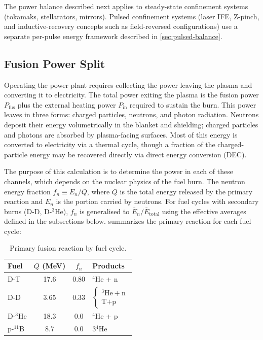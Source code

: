 \documentclass{article}
\begin{document}
The power balance described next applies to steady-state confinement
systems (tokamaks, stellarators, mirrors). Pulsed confinement
systems (laser IFE, Z-pinch, and inductive-recovery concepts such as
field-reversed configurations) use a separate per-pulse energy
framework described in \cref{sec:pulsed-balance}.

\subsection{Fusion Power Split}

Operating the power plant requires collecting the power leaving the
plasma and converting it to electricity. The total power exiting the
plasma is the fusion power $P_{\text{fus}}$ plus the external heating
power $P_{\text{in}}$ required to sustain the burn. This power leaves
in three forms: charged particles, neutrons, and photon
radiation. Neutrons deposit their energy volumetrically in the blanket
and shielding; charged particles and photons are absorbed by
plasma-facing surfaces. Most of this energy is converted to electricity
via a thermal cycle, though a fraction of the charged-particle energy
may be recovered directly via direct energy conversion (DEC).

The purpose of this calculation is to determine the power in each of
these channels, which depends on the nuclear physics of the fuel burn.
The neutron energy fraction
$f_n \equiv E_n / Q$, where $Q$ is the total energy released by the
primary reaction and $E_n$ is the portion carried by neutrons.
For fuel cycles with secondary burns (D-D, D-${}^3$He), $f_n$ is
generalised to $\bar{E}_n / \bar{E}_{\text{total}}$ using the
effective averages defined in the subsections below.
 summarizes the primary reaction
for each fuel cycle:

\begin{table}[htbp]
\caption{Primary fusion reaction by fuel cycle.}
\label{tab:fusion-reactions}
\centering
\renewcommand{\arraystretch}{1.3}
\begin{tabular}{lccl}
\toprule
Fuel & $Q$ (MeV) & $f_n$ & Products \\
\midrule
D-T           & 17.6  & 0.80 & ${}^4$He + n \\
D-D           & 3.65  & 0.33 & $\begin{cases} {}^3\text{He} + \text{n} \\ \text{T} + \text{p} \end{cases}$ \\
D-${}^3$He    & 18.3  & 0.0  & ${}^4$He + p \\
p-${}^{11}$B  & 8.7   & 0.0  & 3${}^4$He \\
\bottomrule
\end{tabular}
\end{table}
\end{document}
